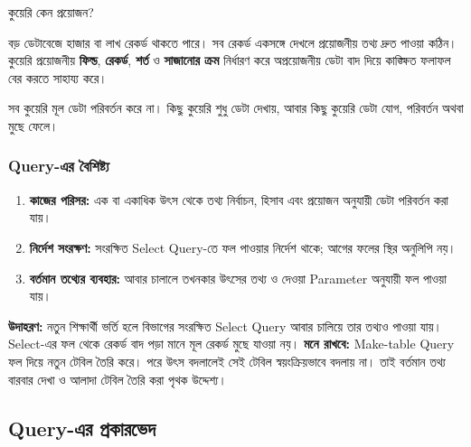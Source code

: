 \begin{keypointbox}{কুয়েরি কেন প্রয়োজন?}

বড় ডেটাবেজে হাজার বা লাখ রেকর্ড থাকতে পারে। সব রেকর্ড একসঙ্গে
দেখলে প্রয়োজনীয় তথ্য দ্রুত পাওয়া কঠিন। কুয়েরি প্রয়োজনীয়
\textbf{ফিল্ড}, \textbf{রেকর্ড}, \textbf{শর্ত} ও
\textbf{সাজানোর ক্রম} নির্ধারণ করে অপ্রয়োজনীয় ডেটা বাদ দিয়ে কাঙ্ক্ষিত
ফলাফল বের করতে সাহায্য করে।

\end{keypointbox}

সব কুয়েরি মূল ডেটা পরিবর্তন করে না। কিছু কুয়েরি শুধু ডেটা দেখায়, আবার কিছু কুয়েরি ডেটা যোগ, পরিবর্তন
অথবা মুছে ফেলে।

\subsubsection{Query-এর বৈশিষ্ট্য}
\begin{enumerate}
\item \textbf{কাজের পরিসর:} এক বা একাধিক উৎস থেকে তথ্য নির্বাচন, হিসাব এবং প্রয়োজন অনুযায়ী ডেটা পরিবর্তন করা যায়।
\item \textbf{নির্দেশ সংরক্ষণ:} সংরক্ষিত Select Query-তে ফল পাওয়ার নির্দেশ থাকে; আগের ফলের স্থির অনুলিপি নয়।
\item \textbf{বর্তমান তথ্যের ব্যবহার:} আবার চালালে তখনকার উৎসের তথ্য ও দেওয়া Parameter অনুযায়ী ফল পাওয়া যায়।
\end{enumerate}
\textbf{উদাহরণ:} নতুন শিক্ষার্থী ভর্তি হলে বিভাগের সংরক্ষিত Select Query আবার চালিয়ে তার তথ্যও পাওয়া যায়। Select-এর ফল থেকে রেকর্ড বাদ পড়া মানে মূল রেকর্ড মুছে যাওয়া নয়।
\textbf{মনে রাখবে:} Make-table Query ফল দিয়ে নতুন টেবিল তৈরি করে। পরে উৎস বদলালেই সেই টেবিল স্বয়ংক্রিয়ভাবে বদলায় না। তাই বর্তমান তথ্য বারবার দেখা ও আলাদা টেবিল তৈরি করা পৃথক উদ্দেশ্য।

\subsection{Query-এর প্রকারভেদ}

\begingroup\setlength{\LTleft}{0pt}\setlength{\LTright}{\fill}\setlength{\LTpre}{2pt}\setlength{\LTpost}{2pt}

\small
\setlength{\tabcolsep}{4pt}
\renewcommand{\arraystretch}{1.10}

